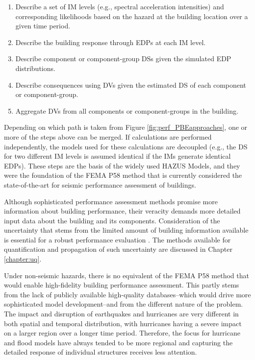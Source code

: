 \begin{enumerate}
    \item Describe a set of IM levels (e.g., spectral acceleration intensities) and corresponding likelihoods based on the hazard at the building location over a given time period.
    \item Describe the building response through EDPs at each IM level.
    \item Describe component or component-group DSs given the simulated EDP distributions.
    \item Describe consequences using DVs given the estimated DS of each component or component-group.
    \item Aggregate DVs from all components or component-groups in the building.
\end{enumerate}

Depending on which path is taken from Figure \ref{fig:perf_PBEapproaches}, one or more of the steps above can be merged. If calculations are performed independently, the models used for these calculations are decoupled (e.g., the DS for two different IM levels is assumed identical if the IMs generate identical EDPs). These steps are the basis of the widely used HAZUS Models, and they were the foundation of the FEMA P58 method that is currently considered the state-of-the-art for seismic performance assessment of buildings.

Although sophisticated performance assessment methods promise more information about building performance, their veracity demands more detailed input data about the building and its components. Consideration of the uncertainty that stems from the limited amount of building information available is essential for a robust performance evaluation \citep{bradley2013critical}. The methods available for quantification and propagation of such uncertainty are discussed in Chapter \ref{chapter:uq}.

Under non-seismic hazards, there is no equivalent of the FEMA P58 method that would enable high-fidelity building performance assessment. This partly stems from the lack of publicly available high-quality databases--which would drive more sophisticated model development--and from the different nature of the problem. The impact and disruption of earthquakes and hurricanes are very different in both spatial and temporal distribution, with hurricanes having a severe impact on a larger region over a longer time period. Therefore, the focus for hurricane and flood models have always tended to be more regional and capturing the detailed response of individual structures receives less attention. 

